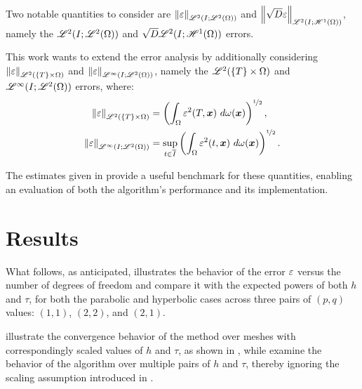 Two notable quantities to consider are $\left\lVert \varepsilon \right\rVert_{\mathscr{L}^{2}(I; \mathscr{L}^{2}(\Omega))}$ and $\left\lVert \sqrt{D} \varepsilon \right\rVert_{\mathscr{L}^{2}(I; \mathscr{H}^{1}(\Omega))}$, namely the $\mathscr{L}^{2}(I; \mathscr{L}^{2}(\Omega))$ and $\sqrt{D} \mathscr{L}^{2}(I; \mathscr{H}^{1}(\Omega))$ errors.

This work wants to extend the error analysis by additionally considering $\left\lVert \varepsilon \right\rVert_{\mathscr{L}^{2}(\left\{ T \right\} \times \Omega)}$ and $\left\lVert \varepsilon \right\rVert_{\mathscr{L}^{\infty}(I; \mathscr{L}^{2}(\Omega))}$, namely the $\mathscr{L}^{2}(\left\{ T \right\} \times \Omega)$ and $\mathscr{L}^{\infty}(I; \mathscr{L}^{2}(\Omega))$ errors, where:
\begin{align}
    \left\lVert \varepsilon \right\rVert_{\mathscr{L}^{2}(\left\{ T \right\} \times \Omega)} &= \left( \int_{\Omega} \varepsilon^2(T, \bm{x}) ~ d \omega (\bm{x}) \right)^{\nicefrac12}, \label{eq:T_error} \\
    \left\lVert \varepsilon \right\rVert_{\mathscr{L}^{\infty}(I; \mathscr{L}^{2}(\Omega))} &= \sup_{t \in \overline{I}} \left( \int_{\Omega} \varepsilon^2(t, \bm{x}) ~ d \omega (\bm{x}) \right)^{\nicefrac12}. \label{eq:inf_error}
\end{align}

The estimates given in  provide a useful benchmark for these quantities, enabling an evaluation of both the algorithm's performance and its implementation.

\newpage
\section{Results} \label{sec:test_results}

What follows, as anticipated, illustrates the behavior of the error $\varepsilon$ versus the number of degrees of freedom and compare it with the expected powers of both $h$ and $\tau$, for both the parabolic and hyperbolic cases across three pairs of $\left( p, q \right)$ values: $\left( 1, 1 \right)$, $\left( 2, 2 \right)$, and $\left( 2, 1 \right)$.

 illustrate the convergence behavior of the method over meshes with correspondingly scaled values of $h$ and $\tau$, as shown in , while  examine the behavior of the algorithm over multiple pairs of $h$ and $\tau$, thereby ignoring the scaling assumption introduced in .

